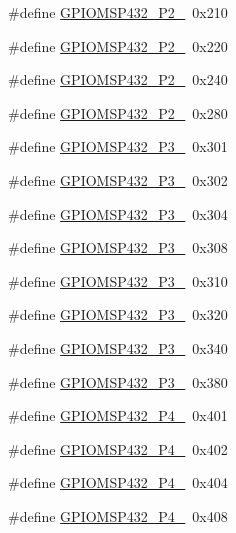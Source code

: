\begin{DoxyCompactItemize}
\item 
\#define \hyperlink{_g_p_i_o_m_s_p432_8h_a121f0345c5a9bc69ae189b3305825d06}{G\+P\+I\+O\+M\+S\+P432\+\_\+\+P2\+\_}~0x210
\item 
\#define \hyperlink{_g_p_i_o_m_s_p432_8h_a60bf1d6d6b287070ffa063d974442590}{G\+P\+I\+O\+M\+S\+P432\+\_\+\+P2\+\_}~0x220
\item 
\#define \hyperlink{_g_p_i_o_m_s_p432_8h_a9d388611cc7a9729ec2a71657b2e66e8}{G\+P\+I\+O\+M\+S\+P432\+\_\+\+P2\+\_}~0x240
\item 
\#define \hyperlink{_g_p_i_o_m_s_p432_8h_a41ddd742d1cef117c1a896ce6e785853}{G\+P\+I\+O\+M\+S\+P432\+\_\+\+P2\+\_}~0x280
\item 
\#define \hyperlink{_g_p_i_o_m_s_p432_8h_a4353f8e24b3ba13cc7f327ab7687eb64}{G\+P\+I\+O\+M\+S\+P432\+\_\+\+P3\+\_}~0x301
\item 
\#define \hyperlink{_g_p_i_o_m_s_p432_8h_af94b5140f5e8f6bc33cce407ab1031cf}{G\+P\+I\+O\+M\+S\+P432\+\_\+\+P3\+\_}~0x302
\item 
\#define \hyperlink{_g_p_i_o_m_s_p432_8h_ae22a285cdf974fc6f912e959ba2e24e5}{G\+P\+I\+O\+M\+S\+P432\+\_\+\+P3\+\_}~0x304
\item 
\#define \hyperlink{_g_p_i_o_m_s_p432_8h_a13aad7ea8201ab79a7c70c3236e03692}{G\+P\+I\+O\+M\+S\+P432\+\_\+\+P3\+\_}~0x308
\item 
\#define \hyperlink{_g_p_i_o_m_s_p432_8h_a59fd1b5edd14250fe9ed8dc8626501ee}{G\+P\+I\+O\+M\+S\+P432\+\_\+\+P3\+\_}~0x310
\item 
\#define \hyperlink{_g_p_i_o_m_s_p432_8h_a86bf97b76b8582d6a72a17510a839f93}{G\+P\+I\+O\+M\+S\+P432\+\_\+\+P3\+\_}~0x320
\item 
\#define \hyperlink{_g_p_i_o_m_s_p432_8h_a66e169fb179ef4d09cd435615904f10b}{G\+P\+I\+O\+M\+S\+P432\+\_\+\+P3\+\_}~0x340
\item 
\#define \hyperlink{_g_p_i_o_m_s_p432_8h_ac4f6f84e46abf5cd5da84414d6626ed4}{G\+P\+I\+O\+M\+S\+P432\+\_\+\+P3\+\_}~0x380
\item 
\#define \hyperlink{_g_p_i_o_m_s_p432_8h_a5b09a8658e2a7019fc88cc07ff939705}{G\+P\+I\+O\+M\+S\+P432\+\_\+\+P4\+\_}~0x401
\item 
\#define \hyperlink{_g_p_i_o_m_s_p432_8h_aaa3a6ae0778633749101394276cfc2bd}{G\+P\+I\+O\+M\+S\+P432\+\_\+\+P4\+\_}~0x402
\item 
\#define \hyperlink{_g_p_i_o_m_s_p432_8h_a70abbf434321825c086ce75112e97cbc}{G\+P\+I\+O\+M\+S\+P432\+\_\+\+P4\+\_}~0x404
\item 
\#define \hyperlink{_g_p_i_o_m_s_p432_8h_a2861a2ba3e20840f307f8bc17f8d4684}{G\+P\+I\+O\+M\+S\+P432\+\_\+\+P4\+\_}~0x408

\end{DoxyCompactItemize}
